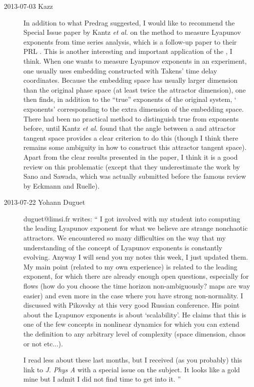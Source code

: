 \begin{description}
\item[2013-07-03 Kazz]
In addition to what Predrag suggested, I would like to recommend
 the Special Issue paper by Kantz \textit{et al.}
 on the method to measure Lyapunov exponents from time series analysis,
 which is a follow-up paper to their PRL .
This is another interesting and important application of the {\cLvs},
 I think.
When one wants to measure Lyapunov exponents in an experiment, one usually uses
 embedding constructed with Takens' time delay coordinates.
Because the embedding space has usually larger dimension
 than the original phase space (at least twice the attractor dimension),
 one then finds, in addition to the ``true'' exponents of the original system,
 `{\transient} exponents' corresponding
 to the extra dimension of the embedding space.
There had been no practical method to distinguish true from {\transient} exponents
 before, until Kantz \textit{et al.} found that the angle between
 a {\cLv} and attractor tangent space provides a clear criterion
 to do this (though I think there remains some ambiguity in how to construct
 this attractor tangent space).
Apart from the clear results presented in the paper,
 I think it is a good review on this problematic (except that
 they underestimate the work by Sano and Sawada,
 which was actually submitted before the famous review by Eckmann and Ruelle).


\item[2013-07-22 Yohann Duguet] duguet@limsi.fr writes: ``
I got involved with my student into computing the leading Lyapunov exponent for what we believe are strange nonchaotic attractors. We encountered so many difficulties on the way that my understanding of the concept of Lyapunov exponents is constantly evolving. Anyway I will send you my notes this week, I just updated them. My main point (related to my own experience) is related to the leading exponent, for which there are already enough open questions, especially for flows (how do you choose the time horizon non-ambiguously? maps are way easier) and even more in the case where you have strong non-normality. I discussed with Pikovsky at this very good Russian conference. His point about the Lyapunov exponents is about `scalability'. He claims that this is one of the few concepts in nonlinear dynamics for which you can extend the definition to any arbitrary level of complexity (space dimension, chaos or not etc...).

I read less about {\cLvs} these last months, but I received (as you probably)  {this link} to \emph{J. Phys A} with a special issue on the subject. It looks like a gold mine but I admit I did not find time to get into it.
''


\end{description}
